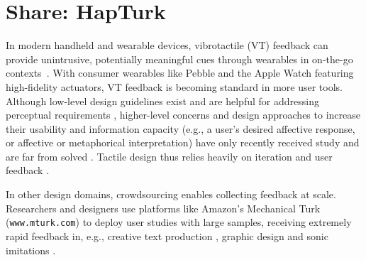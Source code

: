 
\chapter{Share: HapTurk}
\label{ch:hapturk}

%

   In modern handheld and wearable devices, vibrotactile (VT) feedback can provide unintrusive, potentially meaningful cues through wearables in on-the-go contexts~\cite{Brunet2013a}.
    With %
    consumer wearables like Pebble and the Apple Watch featuring high-fidelity actuators, VT feedback is becoming standard  in more user tools.
    Although low-level design guidelines exist and are helpful for addressing perceptual requirements \cite{maclean2003perceptual,InwookHwang2013,Ternes2008,Brewster2004,Brown2006a},  higher-level concerns and design approaches to increase their usability and information capacity (e.g., a user's desired affective response, or affective or metaphorical interpretation) have only recently received study and are far from solved \cite{Obrist2013,Arab2015,Seifi2014,Israr2014,Jansson-Boyd2011,Okamoto2013}.
    Tactile design thus relies heavily on iteration and user feedback \cite{Schneider2014}. 

    In other design domains, crowdsourcing  enables collecting feedback at scale.
    Researchers and designers use platforms like Amazon's Mechanical Turk %
    (\texttt{www.mturk.com}) to deploy user studies with large samples, receiving extremely rapid feedback in, e.g., creative text production \cite{Siangliulue2015}, graphic design \cite{Xu2014} and sonic imitations \cite{Cartwright2015}.
    
